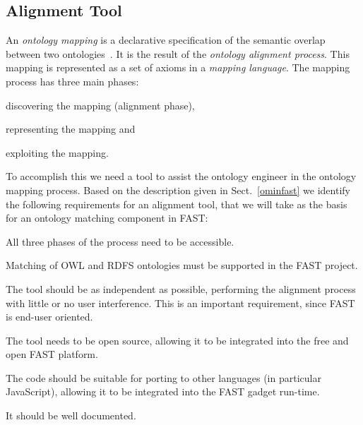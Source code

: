 \subsection{Alignment Tool}
\label{alignmenttool}

An \emph{ontology mapping} is a declarative specification of the semantic overlap between two ontologies~\cite{debruin2005wsml}. It is the result of the \emph{ontology alignment process}. This mapping is represented as a set of axioms in a \emph{mapping language}. The mapping process has three main phases:
\begin{inparaenum}[(1)]
    \item discovering the mapping (alignment phase), 
    \item representing the mapping and 
    \item exploiting the mapping.
\end{inparaenum}  

To accomplish this we need a tool to assist the ontology engineer in the ontology mapping process.
Based on the description given in Sect.~\ref{ominfast} we identify the following requirements for an alignment tool, that we will take as the basis for an ontology matching component in FAST:
\begin{inparaenum}[(i)]
\item All three phases of the process need to be accessible.
\item Matching of OWL and RDFS ontologies must be supported in the FAST project.
\item The tool should be as independent as possible, performing the alignment process with little or no user interference. This is an important requirement, since FAST is end-user oriented.
\item The tool needs to be open source, allowing it to be integrated into the free and open FAST platform.
\item The code should be suitable for porting to other languages (in particular JavaScript), allowing it to be integrated into the FAST gadget run-time.
\item It should be well documented.
\end{inparaenum}

